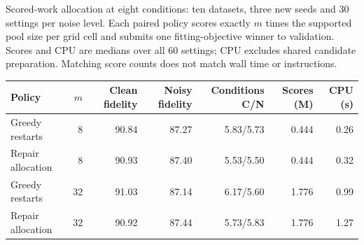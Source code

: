 \begin{kbtable}
\centering
\caption{Scored-work allocation at eight conditions: ten datasets, three new seeds and 30 settings per noise level. Each paired policy scores exactly $m$ times the supported pool size per grid cell and submits one fitting-objective winner to validation. Scores and CPU are medians over all 60 settings; CPU excludes shared candidate preparation. Matching score counts does not match wall time or instructions.}
\label{tab:checklist_work}
\small
\begin{adjustbox}{max width=\linewidth}
\begin{tabular}{lrrrrrr}
\toprule
Policy & $m$ & Clean fidelity & Noisy fidelity & Conditions C/N & Scores (M) & CPU (s) \\
\midrule
Greedy restarts & 8 & 90.84 & 87.27 & 5.83/5.73 & 0.444 & 0.26 \\
Repair allocation & 8 & 90.93 & 87.40 & 5.53/5.50 & 0.444 & 0.32 \\
Greedy restarts & 32 & 91.03 & 87.14 & 6.17/5.60 & 1.776 & 0.99 \\
Repair allocation & 32 & 90.92 & 87.44 & 5.73/5.83 & 1.776 & 1.27 \\
\bottomrule
\end{tabular}
\end{adjustbox}
\end{kbtable}
